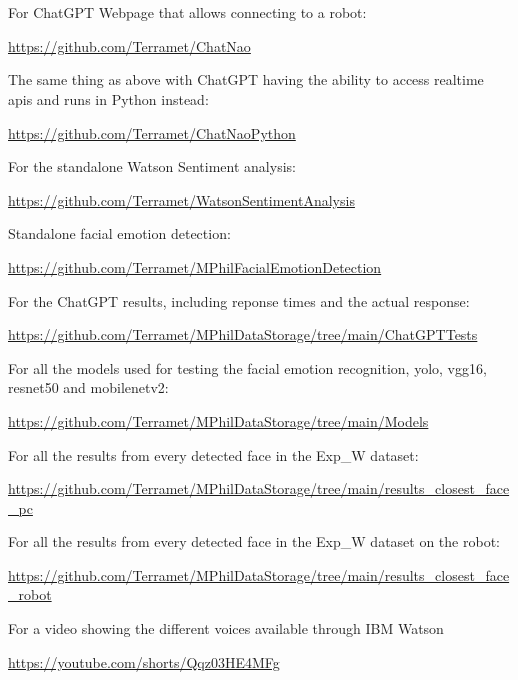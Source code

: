 \chapter{}

\noindent For ChatGPT Webpage that allows connecting to a robot:

\noindent\href{https://github.com/Terramet/ChatNao}{https://github.com/Terramet/ChatNao}

\noindent The same thing as above with ChatGPT having the ability to access realtime apis and runs in Python instead:

\noindent \href{https://github.com/Terramet/ChatNaoPython}{https://github.com/Terramet/ChatNaoPython}

\noindent For the standalone Watson Sentiment analysis: 

\noindent \href{https://github.com/Terramet/WatsonSentimentAnalysis}{https://github.com/Terramet/WatsonSentimentAnalysis}

\noindent Standalone facial emotion detection: 

\noindent \href{https://github.com/Terramet/MPhilFacialEmotionDetection}{https://github.com/Terramet/MPhilFacialEmotionDetection}

\noindent For the ChatGPT results, including reponse times and the actual response:

\noindent \href{https://github.com/Terramet/MPhilDataStorage/tree/main/ChatGPTTests}{https://github.com/Terramet/MPhilDataStorage/tree/main/ChatGPTTests}

\noindent For all the models used for testing the facial emotion recognition, yolo, vgg16, resnet50 and mobilenetv2:

\noindent \href{https://github.com/Terramet/MPhilDataStorage/tree/main/Models}{https://github.com/Terramet/MPhilDataStorage/tree/main/Models}

\noindent For all the results from every detected face in the Exp\_W dataset:

\noindent \href{https://github.com/Terramet/MPhilDataStorage/tree/main/results_closest_face_pc}{https://github.com/Terramet/MPhilDataStorage/tree/main/results\_closest\_face\_pc}

\noindent For all the results from every detected face in the Exp\_W dataset on the robot:

\noindent \href{https://github.com/Terramet/MPhilDataStorage/tree/main/results_closest_face_robot}{https://github.com/Terramet/MPhilDataStorage/tree/main/results\_closest\_face\_robot}
%

\noindent For a video showing the different voices available through IBM Watson

\noindent \href{https://youtube.com/shorts/Qqz03HE4MFg}{https://youtube.com/shorts/Qqz03HE4MFg}
